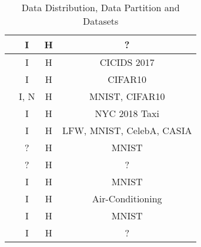 \begin{table}[htp]
\begin{tabular}{c|c|c|c}
\cite{9079513}                      & I                 & H              & ?                                  \\ \hline
\cite{app8122663}                   & I                 & H              & CICIDS 2017                        \\ \hline
\cite{9347812}                      & I                 & H              & CIFAR10                            \\ \hline
\cite{9134967}                      & I, N              & H              & MNIST, CIFAR10                     \\ \hline
\cite{baffle}                       & I                 & H              & NYC 2018 Taxi                      \\ \hline
\cite{9210531}                      & I                 & H              & LFW, MNIST, CelebA, CASIA          \\ \hline
\cite{8894364}                      & ?                 & H              & MNIST                              \\ \hline
\cite{10.48550/arxiv.2112.07938}    & ?                 & H              & ?                                  \\ \hline
\cite{demo}                         & I                 & H              & MNIST                              \\ \hline
\cite{9233457}                      & I                 & H              & Air-Conditioning                   \\ \hline
\cite{9170559}                      & I                 & H              & MNIST                              \\ \hline
\cite{pirate}                       & I                 & H              & ?                                  \\ \hline
\end{tabular}

\caption{Data Distribution, Data Partition and Datasets}
\label{tab:data_distribution}

\end{table}
